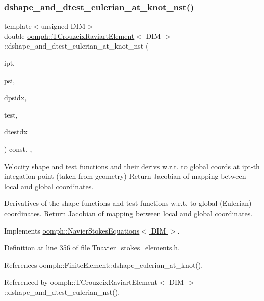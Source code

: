 \subsubsection{\texorpdfstring{dshape\+\_\+and\+\_\+dtest\+\_\+eulerian\+\_\+at\+\_\+knot\+\_\+nst()}{dshape\_and\_dtest\_eulerian\_at\_knot\_nst()}\hspace{0.1cm}{\footnotesize\ttfamily [1/2]}}
{\footnotesize\ttfamily template$<$unsigned D\+IM$>$ \\
double \hyperlink{classoomph_1_1TCrouzeixRaviartElement}{oomph\+::\+T\+Crouzeix\+Raviart\+Element}$<$ D\+IM $>$\+::dshape\+\_\+and\+\_\+dtest\+\_\+eulerian\+\_\+at\+\_\+knot\+\_\+nst (\begin{DoxyParamCaption}\item[{const unsigned \&}]{ipt,  }\item[{\hyperlink{classoomph_1_1Shape}{Shape} \&}]{psi,  }\item[{\hyperlink{classoomph_1_1DShape}{D\+Shape} \&}]{dpsidx,  }\item[{\hyperlink{classoomph_1_1Shape}{Shape} \&}]{test,  }\item[{\hyperlink{classoomph_1_1DShape}{D\+Shape} \&}]{dtestdx }\end{DoxyParamCaption}) const\hspace{0.3cm}{\ttfamily [inline]}, {\ttfamily [protected]}, {\ttfamily [virtual]}}



Velocity shape and test functions and their derivs w.\+r.\+t. to global coords at ipt-\/th integation point (taken from geometry) Return Jacobian of mapping between local and global coordinates. 

Derivatives of the shape functions and test functions w.\+r.\+t. to global (Eulerian) coordinates. Return Jacobian of mapping between local and global coordinates. 

Implements \hyperlink{classoomph_1_1NavierStokesEquations_a46f9c15f162160fab6419f60ef619916}{oomph\+::\+Navier\+Stokes\+Equations$<$ D\+I\+M $>$}.



Definition at line 356 of file Tnavier\+\_\+stokes\+\_\+elements.\+h.



References oomph\+::\+Finite\+Element\+::dshape\+\_\+eulerian\+\_\+at\+\_\+knot().



Referenced by oomph\+::\+T\+Crouzeix\+Raviart\+Element$<$ D\+I\+M $>$\+::dshape\+\_\+and\+\_\+dtest\+\_\+eulerian\+\_\+nst().


